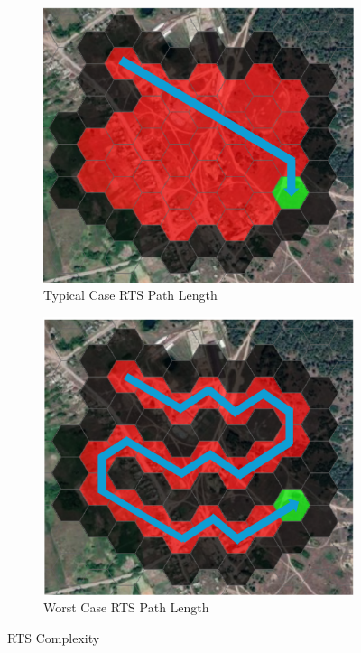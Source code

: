 \begin{figure}[htbp]
  \centering
  \begin{subfigure}[b]{0.48\textwidth}
    \includegraphics[width=\textwidth]{figs/Thomas/Return To Safety/typical_case_complexity.png}
    \caption{Typical Case RTS Path Length}
    \label{fig:typical_case}
  \end{subfigure}
  \hfill
  \begin{subfigure}[b]{0.48\textwidth}
    \includegraphics[width=\textwidth]{figs/Thomas/Return To Safety/worst_case_complexity.png}
    \caption{Worst Case RTS Path Length}
    \label{fig:worst_case}
\end{subfigure}
\caption{RTS Complexity}
\label{fig:rts_complexity}
\end{figure}
